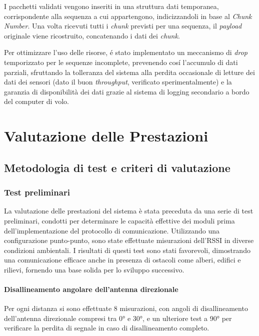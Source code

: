 \documentclass[12pt,a4paper,twoside]{book}
\begin{document}
I pacchetti validati vengono inseriti in una struttura dati temporanea, corrispondente
alla sequenza a cui appartengono, indicizzandoli in base al \emph{Chunk Number}.
Una volta ricevuti tutti i \emph{chunk} previsti per una sequenza, il \emph{payload}
originale viene ricostruito, concatenando i dati dei \emph{chunk}.

Per ottimizzare l'uso delle risorse, \'e stato implementato un meccanismo di \emph{drop}
temporizzato per le sequenze incomplete, prevenendo cos\'i l'accumulo di dati parziali,
sfruttando la tolleranza del sistema alla perdita occasionale di letture dei dati
dei sensori (dato il buon \emph{throughput}, verificato sperimentalmente) e la
garanzia di disponibilità dei dati grazie al sistema di logging secondario a
bordo del computer di volo.

\chapter{Valutazione delle Prestazioni} \label{chap:performance}

\section{Metodologia di test e criteri di valutazione}
\subsection{Test preliminari}
La valutazione delle prestazioni del sistema è stata preceduta da una serie di test
preliminari, condotti per determinare le capacità effettive dei moduli prima
dell'implementazione del protocollo di comunicazione.
Utilizzando una configurazione punto-punto, sono state effettuate misurazioni dell'\ac{RSSI}
in diverse condizioni ambientali.
I risultati di questi test sono stati favorevoli, dimostrando una comunicazione
efficace anche in presenza di ostacoli come alberi, edifici e rilievi, fornendo
una base solida per lo sviluppo successivo.

\newpage
\subsubsection{Disallineamento angolare dell'antenna direzionale}
Per ogni distanza si sono effettuate 8 misurazioni, con angoli di disallineamento
dell'antenna direzionale compresi tra 0° e 30°, e un ulteriore test a 90° per
verificare la perdita di segnale in caso di disallineamento completo.
\end{document}
